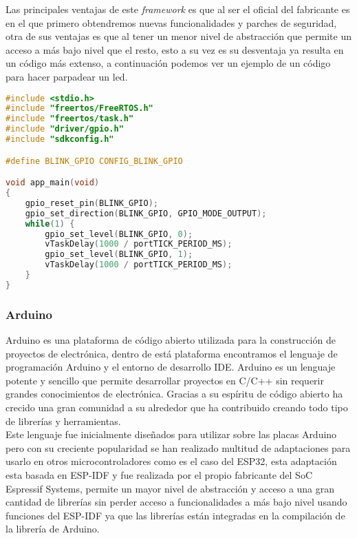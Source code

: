 \documentclass[../proyecto.tex]{subfiles}
\begin{document}
 Las principales ventajas de este \textit{framework} es que al ser el oficial del fabricante es en el que primero obtendremos nuevas funcionalidades y parches de seguridad, otra de sus ventajas es que al tener un menor nivel de abstracción que permite un acceso a más bajo nivel que el resto, esto a su vez es su desventaja ya resulta en un código más extenso, a continuación podemos ver un ejemplo de un código para hacer parpadear un led.\\

\begin{minipage}{\linewidth}
\begin{lstlisting}[language=C, caption=Ejemplo de código para hacer parpadear un led con ESP-IDF, captionpos=b, frame=single]
#include <stdio.h>
#include "freertos/FreeRTOS.h"
#include "freertos/task.h"
#include "driver/gpio.h"
#include "sdkconfig.h"

#define BLINK_GPIO CONFIG_BLINK_GPIO

void app_main(void)
{
    gpio_reset_pin(BLINK_GPIO);
    gpio_set_direction(BLINK_GPIO, GPIO_MODE_OUTPUT);
    while(1) {
        gpio_set_level(BLINK_GPIO, 0);
        vTaskDelay(1000 / portTICK_PERIOD_MS);
        gpio_set_level(BLINK_GPIO, 1);
        vTaskDelay(1000 / portTICK_PERIOD_MS);
    }
}
\end{lstlisting}
\end{minipage}

\subsubsection{Arduino}
Arduino es una plataforma de código abierto utilizada para la construcción de proyectos de electrónica, dentro de está plataforma encontramos el lenguaje de programación Arduino y el entorno de desarrollo IDE. Arduino es un lenguaje potente y sencillo que permite desarrollar proyectos en C/C++ sin requerir grandes conocimientos de electrónica. Gracias a su espíritu de código abierto ha crecido una gran comunidad a su alrededor que ha contribuido creando todo tipo de librerías y herramientas.\\

Este lenguaje fue inicialmente diseñados para utilizar sobre las placas Arduino pero con su creciente popularidad se han realizado multitud de adaptaciones para usarlo en otros microcontroladores como es el caso del ESP32, esta adaptación esta basada en ESP-IDF y fue realizada por el propio fabricante del SoC Espressif Systems, permite un mayor nivel de abstracción y acceso a una gran cantidad de librerías sin perder acceso a funcionalidades a más bajo nivel usando funciones del ESP-IDF ya que las librerías están integradas en la compilación de la librería de Arduino.\\
\end{document}
